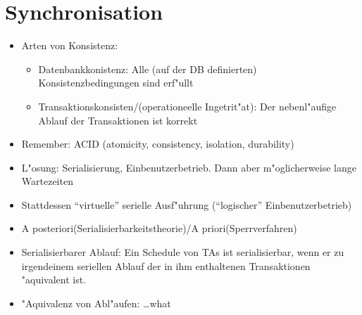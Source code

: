 \documentclass[a4paper, 12pt]{scrartcl}
\begin{document}
\section{Synchronisation}
\begin{itemize}
	\item
		Arten von Konsistenz:
		\begin{itemize}
			\item
				Datenbankkonistenz: Alle (auf der DB definierten) Konsistenzbedingungen sind erf"ullt
			\item
				Transaktionskonsisten/(operationeelle Ingetrit"at): Der nebenl"aufige Ablauf der Transaktionen ist korrekt
		\end{itemize}
	\item
		Remember: ACID (atomicity, consistency, isolation, durability)
	\item
		L"osung: Serialisierung, Einbenutzerbetrieb. Dann aber m"oglicherweise lange Wartezeiten
	\item
		Stattdessen \enquote{virtuelle} serielle Ausf"uhrung (\enquote{logischer} Einbenutzerbetrieb)
	\item
		A posteriori(Serialisierbarkeitstheorie)/A priori(Sperrverfahren)
	\item
		Serialisierbarer Ablauf: Ein Schedule von TAs ist serialisierbar, wenn er zu irgendeinem seriellen Ablauf der in ihm enthaltenen Transaktionen "aquivalent ist.
	\item
		"Aquivalenz von Abl"aufen: \dots what
\end{itemize}
\end{document}
